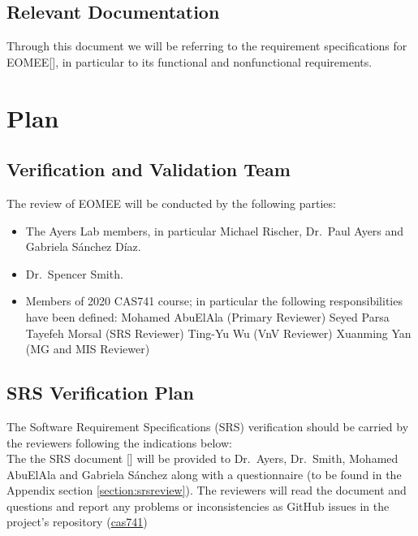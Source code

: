 \documentclass[12pt, titlepage]{article}
\begin{document}
\subsection{Relevant Documentation}


Through this document we will be referring to the requirement specifications for 
EOMEE[\citet{SRS2020}], in particular to its functional and nonfunctional 
requirements.

\section{Plan}
\label{section:plans}

\subsection{Verification and Validation Team}

The review of EOMEE will be conducted by the following parties:
\begin{itemize}
	\item The Ayers Lab members, in particular Michael Rischer, Dr.\ Paul Ayers 
	and Gabriela S\'anchez D\'iaz.
	\item Dr.\ Spencer Smith.
	\item Members of 2020 CAS741 course; in particular the following 
	responsibilities have been defined:
	\subitem Mohamed AbuElAla (Primary Reviewer)
	\subitem Seyed Parsa Tayefeh Morsal (SRS Reviewer)
	\subitem Ting-Yu Wu (VnV Reviewer)
	\subitem Xuanming Yan (MG and MIS Reviewer)
\end{itemize}

\subsection{SRS Verification Plan}

The Software Requirement Specifications (SRS) verification should be carried by 
the reviewers following the indications below:\\
The the SRS document [\cite{SRS2020}] will be provided to Dr.\ Ayers, Dr.\ 
Smith, Mohamed AbuElAla and Gabriela S\'anchez along with a questionnaire (to 
be found in the Appendix section \ref{section:srsreview}). The reviewers 
will read the document and questions and report any problems or 
inconsistencies as GitHub issues in the project's repository 
(\href{https://github.com/gabrielasd/eomee/tree/cas741} 
{cas741})
\end{document}
